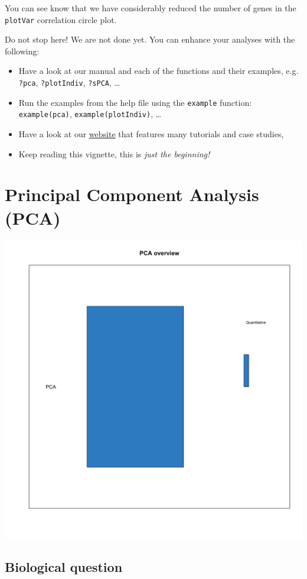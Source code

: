 \documentclass[]{book}
\begin{document}
You can see know that we have considerably reduced the number of genes in the \texttt{plotVar} correlation circle plot.

Do not stop here! We are not done yet. You can enhance your analyses with the following:

\begin{itemize}
\item
  Have a look at our manual and each of the functions and their examples, e.g. \texttt{?pca}, \texttt{?plotIndiv}, \texttt{?sPCA}, \ldots{}
\item
  Run the examples from the help file using the \texttt{example} function: \texttt{example(pca)}, \texttt{example(plotIndiv)}, \ldots{}
\item
  Have a look at our \href{http://www.mixomics.org}{website} that features many tutorials and case studies,
\item
  Keep reading this vignette, this is \emph{just the beginning!}
\end{itemize}

\hypertarget{pca}{%
\chapter{Principal Component Analysis (PCA)}\label{pca}}

\begin{center}\includegraphics[width=0.75\linewidth,]{Figures/03-overview-PCA-1} \end{center}

\hypertarget{biological-question}{%
\section{Biological question}\label{biological-question}}
\end{document}
